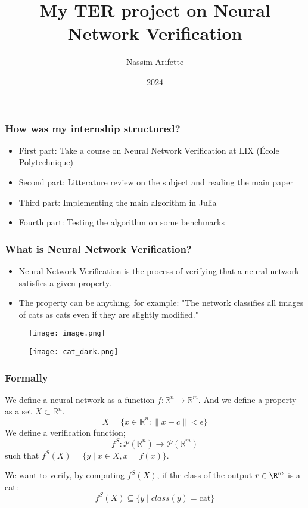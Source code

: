 \documentclass{beamer}
\title{My TER project on Neural Network Verification}
\author{Nassim Arifette}
\institute{Université Paris-Saclay}
\date{2024}
\begin{document}
\frame{\titlepage}

\begin{frame}
\frametitle{How was my internship structured?}
    \begin{itemize}
    \item First part: Take a course on Neural Network Verification at LIX (École Polytechnique)
    \item Second part: Litterature review on the subject and reading the main paper
    \item Third part: Implementing the main algorithm in Julia
    \item Fourth part: Testing the algorithm on some benchmarks
    \end{itemize}
\end{frame}

\begin{frame}
\frametitle{What is Neural Network Verification?}
    \begin{itemize}
    \item Neural Network Verification is the process of verifying that a neural network satisfies a given property.
    \item The property can be anything, for example: "The network classifies all images of cats as cats even if they are slightly modified."
    \end{itemize}

    \begin{figure}
        \centering
        \begin{minipage}{0.40\linewidth}
            \centering
            \texttt{[image: image.png]}
            \label{fig:cat1}
        \end{minipage}
        \hfill
        \begin{minipage}{0.40\linewidth}
            \centering
            \texttt{[image: cat\_dark.png]}
            \label{fig:cat2}
        \end{minipage}
    \end{figure}
\end{frame}

\begin{frame}
\frametitle{Formally}
    We define a neural network as a function $f: \mathbb{R}^n \rightarrow \mathbb{R}^m$.
    And we define a property as a set $X \subset \mathbb{R}^n$.
        \[X = \{x \in \mathbb{R}^n : \|x - c\| < \epsilon \} \]
    We define a verification function;
    \[f^S: \mathcal{P}( \mathbb{R}^n) \to \mathcal{P}( \mathbb{R}^m)\] such that $f^S(X) = \{y \mid x \in X, x = f(x)\}$.

    We want to verify, by computing \(f^S(X) \), if the class of the output \(r \in \R^m\) is a cat: 
    \[ f^S(X) \subseteq \{y \mid class(y) = \text{cat} \} \]


\end{frame}
\end{document}

